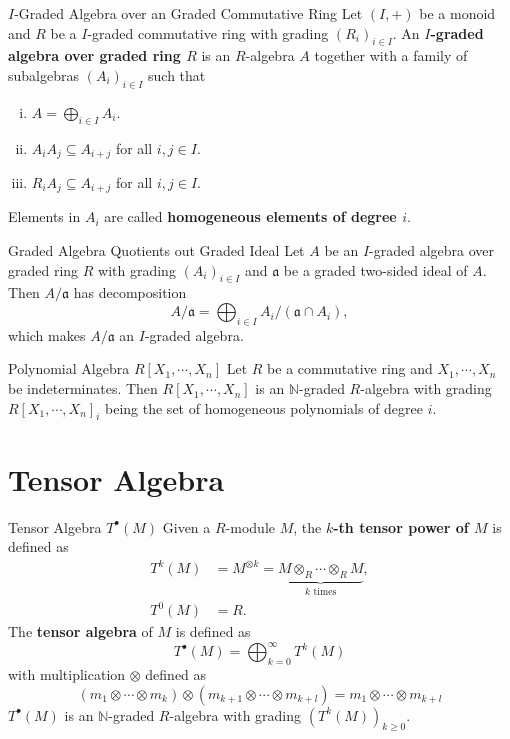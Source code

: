 \begin{definition}{$I$-Graded Algebra over an Graded Commutative Ring}{}
    Let $(I,+)$ be a monoid and $R$ be a $I$-graded commutative ring with grading $(R_i)_{i\in I}$. An \textbf{$I$-graded algebra over graded ring $R$} is an $R$-algebra $A$ together with a family of subalgebras $\left(A_i\right)_{i\in I}$ such that
    \begin{enumerate}[(i)]
        \item $A=\bigoplus_{i\in I}A_i$.
        \item $A_iA_j\subseteq A_{i+j}$ for all $i, j\in I$.
        \item $R_iA_j\subseteq A_{i+j}$ for all $i, j\in I$.
    \end{enumerate}
    Elements in $A_i$ are called \textbf{homogeneous elements of degree $i$}.
\end{definition}


\begin{proposition}{Graded Algebra Quotients out Graded Ideal}{}
    Let $A$ be an $I$-graded algebra over graded ring $R$ with grading $(A_i)_{i\in I}$ and $\mathfrak{a}$ be a graded two-sided ideal of $A$. Then $A/\mathfrak{a}$ has decomposition
    \[
    A/ \mathfrak{a}=\bigoplus_{i\in I}A_i/\left(\mathfrak{a}\cap A_i\right),    
    \]
    which makes $A/\mathfrak{a}$ an $I$-graded algebra.
\end{proposition}



\begin{example}{Polynomial Algebra $R[X_1,\cdots,X_n]$}{}
    Let $R$ be a commutative ring and $X_1,\cdots,X_n$ be indeterminates. Then $R[X_1,\cdots,X_n]$ is an $\mathbb{N}$-graded $R$-algebra with grading $R[X_1,\cdots,X_n]_i$ being the set of homogeneous polynomials of degree $i$.
\end{example}



\section{Tensor Algebra}
\begin{definition}{Tensor Algebra $T^{\bullet}(M)$}{}
    Given a $R$-module $M$, the \textbf{$k$-th tensor power of $M$} is defined as
    \begin{align*}
        T^k(M)&=M^{\otimes k}=\underbrace{M\otimes_R\cdots\otimes_R M}_{k\text{ times}},\\
        T^0(M)&=R.
    \end{align*}
    The \textbf{tensor algebra} of $M$ is defined as
    \[
        T^{\bullet}(M)=\bigoplus_{k=0}^{\infty}T^k(M)
    \]
    with multiplication $\otimes$ defined as
    \[
        (m_1\otimes\cdots\otimes m_k)\otimes(m_{k+1}\otimes\cdots\otimes m_{k+l})=m_1\otimes\cdots\otimes m_{k+l}
    \]
    $T^{\bullet}(M)$ is an $\mathbb{N}$-graded $R$-algebra with grading $(T^k(M))_{k\ge 0}$.
\end{definition}


